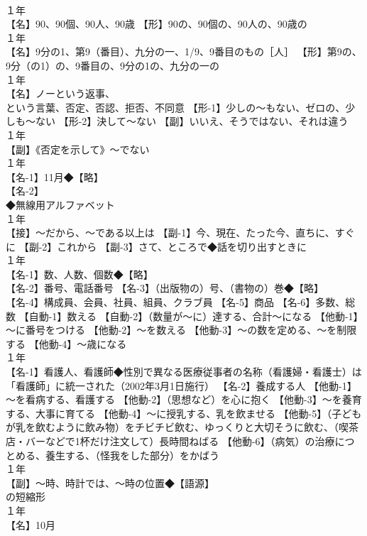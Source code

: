 \documentclass[8pt]{extreport}
\begin{document}
\begin{CJK}{UTF8}{min}
\\	１年	
\\	【名】90、90個、90人、90歳 【形】90の、90個の、90人の、90歳の
\\	１年	
\\	【名】9分の1、第9（番目）、九分の一、1/9、9番目のもの［人］ 【形】第9の、9分（の1）の、9番目の、9分の1の、九分の一の
\\	１年	
\\	【名】ノーという返事、
\\	という言葉、否定、否認、拒否、不同意 【形-1】少しの～もない、ゼロの、少しも～ない 【形-2】決して～ない 【副】いいえ、そうではない、それは違う
\\	１年	
\\	【副】《否定を示して》～でない
\\	１年	
\\	【名-1】11月◆【略】
\\	【名-2】
\\	◆無線用アルファベット
\\	１年	
\\	【接】～だから、～である以上は 【副-1】今、現在、たった今、直ちに、すぐに 【副-2】これから 【副-3】さて、ところで◆話を切り出すときに
\\	１年	
\\	【名-1】数、人数、個数◆【略】
\\	【名-2】番号、電話番号 【名-3】（出版物の）号、（書物の）巻◆【略】
\\	【名-4】構成員、会員、社員、組員、クラブ員 【名-5】商品 【名-6】多数、総数 【自動-1】数える 【自動-2】（数量が～に）達する、合計～になる 【他動-1】～に番号をつける 【他動-2】～を数える 【他動-3】～の数を定める、～を制限する 【他動-4】～歳になる
\\	１年	
\\	【名-1】看護人、看護師◆性別で異なる医療従事者の名称（看護婦・看護士）は「看護師」に統一された（2002年3月1日施行） 【名-2】養成する人 【他動-1】～を看病する、看護する 【他動-2】（思想など）を心に抱く 【他動-3】～を養育する、大事に育てる 【他動-4】～に授乳する、乳を飲ませる 【他動-5】（子どもが乳を飲むように飲み物）をチビチビ飲む、ゆっくりと大切そうに飲む、（喫茶店・バーなどで1杯だけ注文して）長時間ねばる 【他動-6】（病気）の治療につとめる、養生する、（怪我をした部分）をかばう
\\	１年	
\\	【副】～時、時計では、～時の位置◆【語源】
\\	の短縮形
\\	１年	
\\	【名】10月

\end{CJK}
\end{document}
